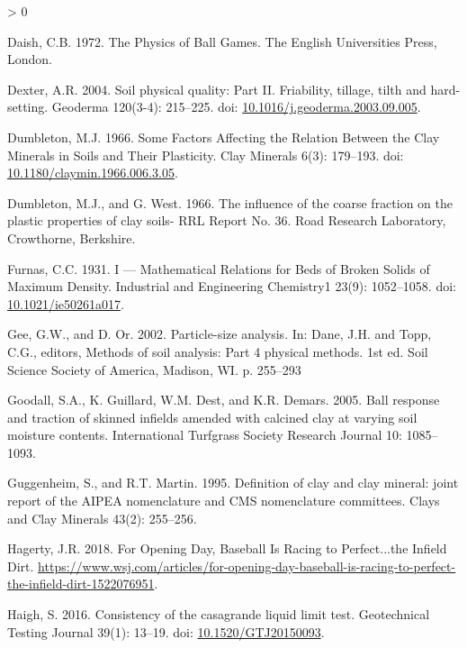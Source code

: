 \documentclass[
  letterpaper,
  openany]{book}
\newlength{\cslhangindent}
\newenvironment{CSLReferences}[2] %
 {%
  \setlength{\parindent}{0pt}
  \ifodd #1 \everypar{\setlength{\hangindent}{\cslhangindent}}\ignorespaces\fi
  \ifnum #2 > 0
  \setlength{\parskip}{#2\baselineskip}
  \fi
 }%
 {}
\begin{document}
\begin{CSLReferences}{1}{0}
\leavevmode\hypertarget{ref-Daish1972}{}%
Daish, C.B. 1972. {The Physics of Ball Games}. The English Universities Press, London.

\leavevmode\hypertarget{ref-Dexter2004}{}%
Dexter, A.R. 2004. {Soil physical quality: Part II. Friability, tillage, tilth and hard-setting}. Geoderma 120(3-4): 215--225. doi: \href{https://doi.org/10.1016/j.geoderma.2003.09.005}{10.1016/j.geoderma.2003.09.005}.

\leavevmode\hypertarget{ref-Dumbleton1966a}{}%
Dumbleton, M.J. 1966. {Some Factors Affecting the Relation Between the Clay Minerals in Soils and Their Plasticity}. Clay Minerals 6(3): 179--193. doi: \href{https://doi.org/10.1180/claymin.1966.006.3.05}{10.1180/claymin.1966.006.3.05}.

\leavevmode\hypertarget{ref-Dumbleton1966b}{}%
Dumbleton, M.J., and G. West. 1966. {The influence of the coarse fraction on the plastic properties of clay soils- RRL Report No. 36}. Road Research Laboratory, Crowthorne, Berkshire.

\leavevmode\hypertarget{ref-Furnas1931}{}%
Furnas, C.C. 1931. {I --- Mathematical Relations for Beds of Broken Solids of Maximum Density}. Industrial and Engineering Chemistry1 23(9): 1052--1058. doi: \href{https://doi.org/10.1021/ie50261a017}{10.1021/ie50261a017}.

\leavevmode\hypertarget{ref-Gee2002}{}%
Gee, G.W., and D. Or. 2002. {Particle-size analysis}. In: Dane, J.H. and Topp, C.G., editors, Methods of soil analysis: Part 4 physical methods. 1st ed. Soil Science Society of America, Madison, WI. p. 255--293

\leavevmode\hypertarget{ref-Goodall2005}{}%
Goodall, S.A., K. Guillard, W.M. Dest, and K.R. Demars. 2005. {Ball response and traction of skinned infields amended with calcined clay at varying soil moisture contents}. International Turfgrass Society Research Journal 10: 1085--1093.

\leavevmode\hypertarget{ref-Guggenheim1995}{}%
Guggenheim, S., and R.T. Martin. 1995. {Definition of clay and clay mineral: joint report of the AIPEA nomenclature and CMS nomenclature committees}. Clays and Clay Minerals 43(2): 255--256.

\leavevmode\hypertarget{ref-Hagerty2018}{}%
Hagerty, J.R. 2018. {For Opening Day, Baseball Is Racing to Perfect...the Infield Dirt}. \url{https://www.wsj.com/articles/for-opening-day-baseball-is-racing-to-perfect-the-infield-dirt-1522076951}.

\leavevmode\hypertarget{ref-Haigh2016}{}%
Haigh, S. 2016. {Consistency of the casagrande liquid limit test}. Geotechnical Testing Journal 39(1): 13--19. doi: \href{https://doi.org/10.1520/GTJ20150093}{10.1520/GTJ20150093}.


\end{CSLReferences}
\end{document}
